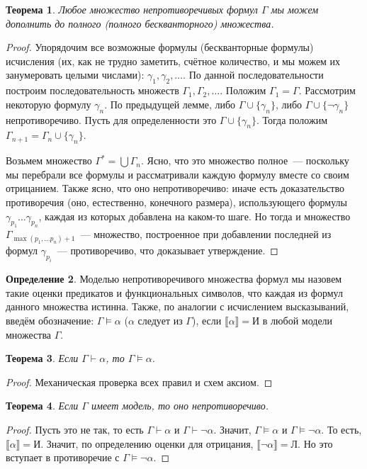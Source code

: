 \documentclass[a4paper,11pt]{article}
\newtheorem{thm}{Теорема}[section]
\theoremstyle{definition}
\newtheorem{dfn}[thm]{Определение}
\newcommand{\proves}{\vdash}
\newcommand{\True}{\text{И}}
\newcommand{\False}{\text{Л}}
\begin{document}
\begin{thm}\label{thm:complete-set}
Любое множество непротиворечивых формул $\Gamma$ мы можем дополнить до полного
(полного бескванторного) множества.
\end{thm}
\begin{proof}
Упорядочим все возможные формулы (бескванторные формулы) исчисления (их, как не
трудно заметить, счётное количество, и мы можем их занумеровать целыми числами):
$\gamma_1, \gamma_2, \dots$. По данной последовательности построим
последовательность множеств $\Gamma_1, \Gamma_2, \dots$. Положим $\Gamma_1 =
\Gamma$. Рассмотрим некоторую формулу $\gamma_n$. По предыдущей лемме, либо
$\Gamma \cup \{\gamma_n\}$, либо $\Gamma \cup \{\neg\gamma_n\}$ непротиворечиво.
Пусть для определенности это $\Gamma \cup \{\gamma_n\}$. Тогда положим
$\Gamma_{n+1} = \Gamma_n \cup \{\gamma_n\}$.

Возьмем множество $\Gamma^* = \bigcup \Gamma_n$. Ясно, что это множество
полное~--- поскольку мы перебрали все формулы и рассматривали каждую формулу
вместе со своим отрицанием. Также ясно, что оно непротиворечиво: иначе есть
доказательство противоречия (оно, естественно, конечного размера),
использующего формулы $\gamma_{p_1} \dots \gamma_{p_n}$, каждая из которых
добавлена на каком-то шаге. Но тогда и множество $\Gamma_{\max(p_1,\dots
p_n)+1}$~--- множество, построенное при добавлении последней из формул
$\gamma_{p_i}$~--- противоречиво, что доказывает утверждение.
\end{proof}

\begin{dfn}
Моделью непротиворечивого множества формул мы назовем такие оценки предикатов и
функциональных символов, что каждая из формул данного множества истинна. Также,
по аналогии с исчислением высказываний, введём обозначение: $\Gamma \models
\alpha$ ($\alpha$ следует из $\Gamma$), если $\llbracket\alpha\rrbracket =
\True$ в любой модели множества $\Gamma$.
\end{dfn}

\begin{thm}
Если $\Gamma \proves \alpha$, то $\Gamma \models \alpha$.
\end{thm}
\begin{proof}
Механическая проверка всех правил и схем аксиом.
\end{proof}

\begin{thm}
Если $\Gamma$ имеет модель, то оно непротиворечиво.
\end{thm}
\begin{proof}
Пусть это не так, то есть $\Gamma \proves \alpha$ и $\Gamma \proves \neg\alpha$.
Значит, $\Gamma \models \alpha$ и $\Gamma \models \neg\alpha$. То есть,
$\llbracket\alpha\rrbracket = \True$. Значит, по определению оценки для
отрицания, $\llbracket\neg\alpha\rrbracket = \False$. Но это вступает в
противоречие с $\Gamma \models \neg\alpha$.
\end{proof}
\end{document}
